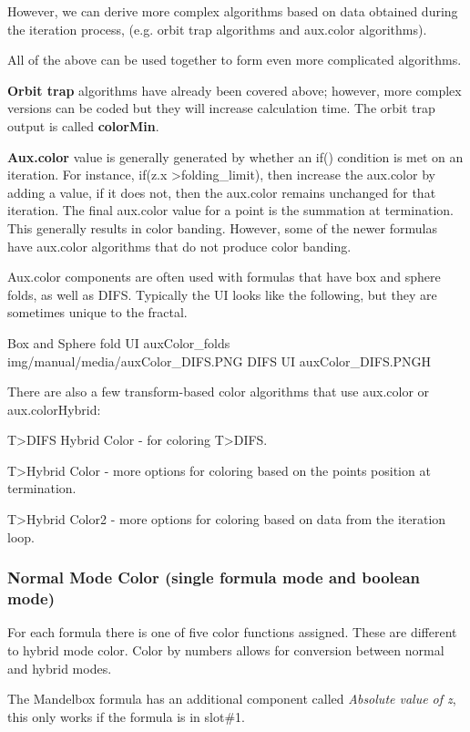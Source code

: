 However, we can derive more complex algorithms based on data obtained during the iteration process, (e.g. orbit trap algorithms and aux.color algorithms).

All of the above can be used together to form even more complicated algorithms.

\textbf{Orbit trap} algorithms have already been covered above; however, more complex versions can be coded but they will increase calculation time. The orbit trap output is called \textbf{colorMin}.

\textbf{Aux.color} value is generally generated by whether an if() condition is met on an iteration. For instance, if(z.x \textgreater\space folding\_limit), then increase the aux.color by adding a value, if it does not, then the aux.color remains unchanged for that iteration. The final aux.color value for a point is the summation at termination. This generally results in color banding. However, some of the newer formulas have aux.color algorithms that do not produce color banding.

Aux.color components are often used with formulas that have box and sphere folds, as well as DIFS. Typically the UI looks like the following, but they are sometimes unique to the fractal.

{Box and Sphere fold UI}
{auxColor_folds}
{img/manual/media/auxColor_DIFS.PNG}
{DIFS UI}
{auxColor_DIFS.PNG}{H}

There are also a few transform-based color algorithms that use aux.color or aux.colorHybrid:

T>DIFS Hybrid Color - for coloring T>DIFS.

T>Hybrid Color - more options for coloring based on the points position at termination.

T>Hybrid Color2 - more options for coloring based on data from the iteration loop.

\subsubsection{Normal Mode Color (single formula mode and boolean mode)}\label{materials-normal-mode-color}

For each formula there is one of five color functions assigned.
These are different to hybrid mode color. Color by numbers allows for conversion between normal and hybrid modes.

The Mandelbox formula has an additional component called \emph{Absolute value of z}, this only works if the formula is in slot\#1.


